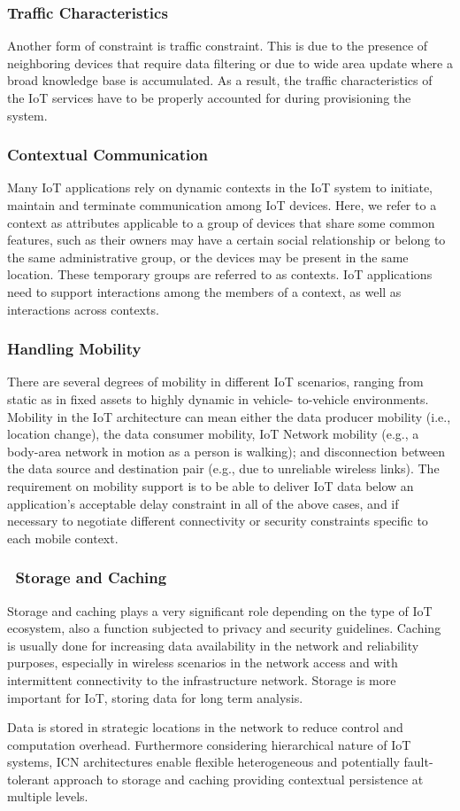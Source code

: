 \subsubsection{Traffic Characteristics
}Another form of constraint is traffic constraint. This is due to the presence of neighboring devices that require data filtering or due to wide area update where a broad knowledge base is accumulated. As a result, the traffic characteristics of the IoT services have to be properly accounted for during provisioning the system. 
\subsubsection{Contextual Communication
}Many IoT applications rely on dynamic contexts in the IoT system to initiate, maintain and terminate communication among IoT devices. Here, we refer to a context as attributes applicable to a group of devices that share some common features, such as their owners may have a certain social relationship or belong to the same administrative group, or the devices may be present in the same location. These temporary groups are referred to as contexts. IoT applications need to support interactions among the members of a context, as well as interactions across contexts. 
\subsubsection{Handling Mobility
}There are several degrees of mobility in different IoT scenarios, ranging from static as in fixed assets to highly dynamic in vehicle- to-vehicle environments. Mobility in the IoT architecture can mean either the data producer mobility (i.e., location change), the data consumer mobility, IoT Network mobility (e.g., a body-area network in motion as a person is walking); and disconnection between the data source and destination pair (e.g., due to unreliable wireless links). The requirement on mobility support is to be able to deliver IoT data below an application's acceptable delay constraint in all of the above cases, and if necessary to negotiate different connectivity or security constraints specific to each mobile context. 

\subsubsection{ Storage and Caching
}Storage and caching plays a very significant role depending on the type of IoT ecosystem, also a function subjected to privacy and security guidelines. Caching is usually done for increasing data availability in the network and reliability purposes, especially in wireless scenarios in the network access and with intermittent connectivity to the infrastructure network. Storage is more important for IoT, storing data for long term analysis. \par
Data is stored in strategic locations in the network to reduce control and computation overhead. Furthermore considering hierarchical nature of IoT systems, ICN architectures enable flexible heterogeneous and potentially fault-tolerant approach to storage and caching providing contextual persistence at multiple levels. 
